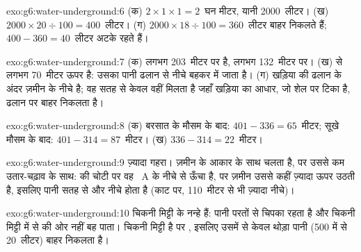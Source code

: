 \begin{solution}{exo:g6:water-underground:6}
(क) $2 \times 1 \times 1 = 2$~घन मीटर, यानी 2000~लीटर।
(ख) $2000 \times 20 \div 100 = 400$~लीटर। (ग) $2000 \times 18 \div 100 =
360$~लीटर बाहर निकलते हैं; $400 - 360 = 40$~लीटर अटके रहते हैं।
\end{solution}

\begin{solution}{exo:g6:water-underground:7}
(क)  लगभग 203~मीटर पर है,  लगभग 132~मीटर पर। (ख)   से लगभग
70~मीटर ऊपर है: उसका पानी ढलान से नीचे बहकर  में जाता है। (ग) खड़िया की
 ढलान के अंदर  ज़मीन के नीचे है; वह सतह से केवल वहीं मिलता है
जहाँ खड़िया का आधार, जो  शेल पर टिका है, ढलान पर बाहर
निकलता है।
\end{solution}

\begin{solution}{exo:g6:water-underground:8}
(क) बरसात के मौसम के बाद: $401 - 336 = 65$~मीटर; सूखे मौसम के बाद:
$401 - 314 = 87$~मीटर। (ख) $336 - 314 = 22$~मीटर।
\end{solution}

\begin{solution}{exo:g6:water-underground:9}
ज़्यादा गहरा।  ज़मीन के आकार के साथ चलता है, पर उससे कम उतार-चढ़ाव
के साथ:  की चोटी पर वह ~A के नीचे से ऊँचा है, पर ज़मीन उससे कहीं
ज़्यादा ऊपर उठती है, इसलिए पानी सतह से और नीचे होता है (काट पर, 110~मीटर से
भी ज़्यादा नीचे)।
\end{solution}

\begin{solution}{exo:g6:water-underground:10}
चिकनी मिट्टी के  नन्हे हैं: पानी परतों से चिपका रहता है और चिकनी मिट्टी
में से  की ओर नहीं बह पाता। चिकनी मिट्टी  है पर , इसलिए उसमें
से केवल थोड़ा पानी (500 में से 20~लीटर) बाहर निकलता है।
\end{solution}

